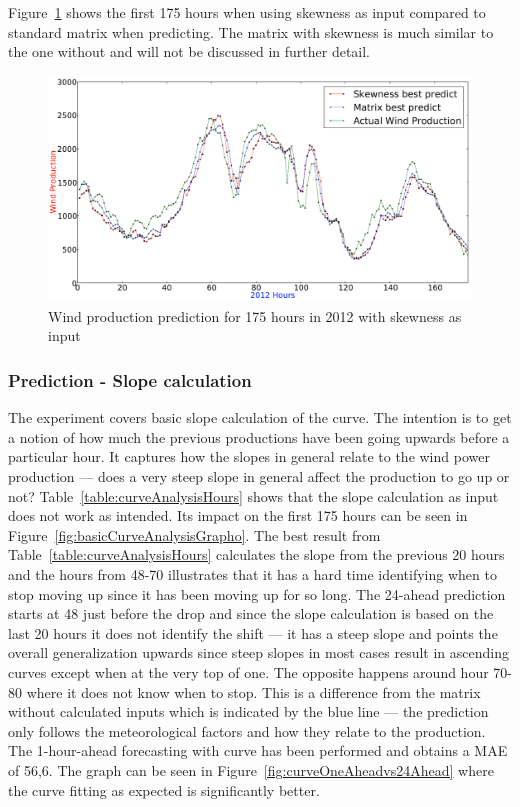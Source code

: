 Figure~\ref{fig:bestSkewnessGraph} shows the first 175 hours when using skewness as input compared to standard matrix when predicting. The matrix with skewness is much similar to the one without and will not be discussed in further detail. 

\begin{figure}[H]
\centering
\includegraphics[width=0.99\linewidth]{billeder/bestSkewnessGraph.png}
\caption{Wind production prediction for 175 hours in 2012 with skewness as input}
\label{fig:bestSkewnessGraph}
\end{figure}    

\subsubsection{Prediction - Slope calculation}
The experiment covers basic slope calculation of the curve. The intention is to get a notion of how much the previous productions have been going upwards before a particular hour. It captures how the slopes in general relate to the wind power production --- does a very steep slope in general affect the production to go up or not? Table~\ref{table:curveAnalysisHours} shows that the slope calculation as input does not work as intended. Its impact on the first 175 hours can be seen in Figure~\ref{fig:basicCurveAnalysisGrapho}. The best result from Table~\ref{table:curveAnalysisHours} calculates the slope from the previous 20 hours and the hours from 48-70 illustrates that it has a hard time identifying when to stop moving up since it has been moving up for so long. The 24-ahead prediction starts at 48 just before the drop and since the slope calculation is based on the last 20 hours it does not identify the shift --- it has a steep slope and points the overall generalization upwards since steep slopes in most cases result in ascending curves except when at the very top of one. The opposite happens around hour 70-80 where it does not know when to stop. This is a difference from the matrix without calculated inputs which is indicated by the blue line --- the prediction only follows the meteorological factors and how they relate to the production. The 1-hour-ahead forecasting with curve has been performed and obtains a MAE of 56,6. The graph can be seen in Figure~\ref{fig:curveOneAheadvs24Ahead} where the curve fitting as expected is significantly better.

